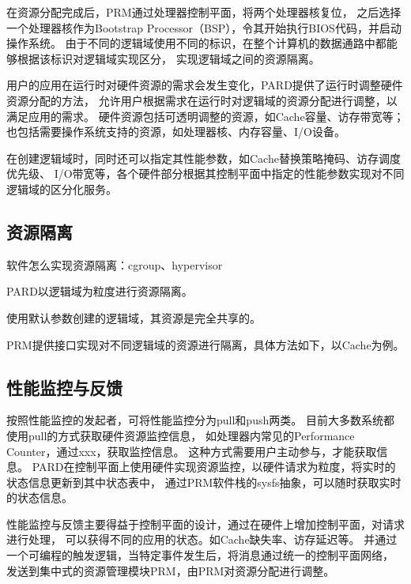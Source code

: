 在资源分配完成后，PRM通过处理器控制平面，将两个处理器核复位，
之后选择一个处理器核作为Bootstrap Processor（BSP），令其开始执行BIOS代码，并启动操作系统。
由于不同的逻辑域使用不同的标识，在整个计算机的数据通路中都能够根据该标识对逻辑域实现区分，
实现逻辑域之间的资源隔离。

用户的应用在运行时对硬件资源的需求会发生变化，PARD提供了运行时调整硬件资源分配的方法，
允许用户根据需求在运行时对逻辑域的资源分配进行调整，以满足应用的需求。
硬件资源包括可透明调整的资源，如Cache容量、访存带宽等；
也包括需要操作系统支持的资源，如处理器核、内存容量、I/O设备。

在创建逻辑域时，同时还可以指定其性能参数，如Cache替换策略掩码、访存调度优先级、
I/O带宽等，各个硬件部分根据其控制平面中指定的性能参数实现对不同逻辑域的区分化服务。


\subsection{资源隔离}

软件怎么实现资源隔离：cgroup、hypervisor

PARD以逻辑域为粒度进行资源隔离。



使用默认参数创建的逻辑域，其资源是完全共享的。

PRM提供接口实现对不同逻辑域的资源进行隔离，具体方法如下，以Cache为例。




\subsection{性能监控与反馈}

按照性能监控的发起者，可将性能监控分为pull和push两类。
目前大多数系统都使用pull的方式获取硬件资源监控信息，
如处理器内常见的Performance Counter，通过xxx，获取监控信息。
这种方式需要用户主动参与，才能获取信息。
PARD在控制平面上使用硬件实现资源监控，以硬件请求为粒度，将实时的状态信息更新到其中状态表中，
通过PRM软件栈的sysfs抽象，可以随时获取实时的状态信息。

性能监控与反馈主要得益于控制平面的设计，通过在硬件上增加控制平面，对请求进行处理，
可以获得不同的应用的状态。如Cache缺失率、访存延迟等。
并通过一个可编程的触发逻辑，当特定事件发生后，将消息通过统一的控制平面网络，
发送到集中式的资源管理模块PRM，由PRM对资源分配进行调整。

